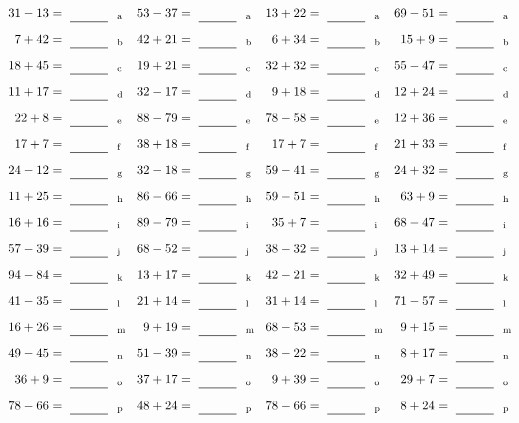 \documentclass
[
  draft    = true,
  fontsize = 11pt,
  parskip  = half-
]
{scrartcl}
\begin{document}
\clearpage
\begin{align*}
    \pline{31-13}&=\rline{a}
  & \pline{53-37}&=\rline{a}
  & \pline{13+22}&=\rline{a}
  & \pline{69-51}&=\rline{a} \\[1ex]
    \pline{7+42}&=\rline{b}
  & \pline{42+21}&=\rline{b}
  & \pline{6+34}&=\rline{b}
  & \pline{15+9}&=\rline{b} \\[1ex]
    \pline{18+45}&=\rline{c}
  & \pline{19+21}&=\rline{c}
  & \pline{32+32}&=\rline{c}
  & \pline{55-47}&=\rline{c} \\[1ex]
    \pline{11+17}&=\rline{d}
  & \pline{32-17}&=\rline{d}
  & \pline{9+18}&=\rline{d}
  & \pline{12+24}&=\rline{d} \\[1ex]
    \pline{22+8}&=\rline{e}
  & \pline{88-79}&=\rline{e}
  & \pline{78-58}&=\rline{e}
  & \pline{12+36}&=\rline{e} \\[1ex]
    \pline{17+7}&=\rline{f}
  & \pline{38+18}&=\rline{f}
  & \pline{17+7}&=\rline{f}
  & \pline{21+33}&=\rline{f} \\[1ex]
    \pline{24-12}&=\rline{g}
  & \pline{32-18}&=\rline{g}
  & \pline{59-41}&=\rline{g}
  & \pline{24+32}&=\rline{g} \\[1ex]
    \pline{11+25}&=\rline{h}
  & \pline{86-66}&=\rline{h}
  & \pline{59-51}&=\rline{h}
  & \pline{63+9}&=\rline{h} \\[1ex]
    \pline{16+16}&=\rline{i}
  & \pline{89-79}&=\rline{i}
  & \pline{35+7}&=\rline{i}
  & \pline{68-47}&=\rline{i} \\[1ex]
    \pline{57-39}&=\rline{j}
  & \pline{68-52}&=\rline{j}
  & \pline{38-32}&=\rline{j}
  & \pline{13+14}&=\rline{j} \\[1ex]
    \pline{94-84}&=\rline{k}
  & \pline{13+17}&=\rline{k}
  & \pline{42-21}&=\rline{k}
  & \pline{32+49}&=\rline{k} \\[1ex]
    \pline{41-35}&=\rline{l}
  & \pline{21+14}&=\rline{l}
  & \pline{31+14}&=\rline{l}
  & \pline{71-57}&=\rline{l} \\[1ex]
    \pline{16+26}&=\rline{m}
  & \pline{9+19}&=\rline{m}
  & \pline{68-53}&=\rline{m}
  & \pline{9+15}&=\rline{m} \\[1ex]
    \pline{49-45}&=\rline{n}
  & \pline{51-39}&=\rline{n}
  & \pline{38-22}&=\rline{n}
  & \pline{8+17}&=\rline{n} \\[1ex]
    \pline{36+9}&=\rline{o}
  & \pline{37+17}&=\rline{o}
  & \pline{9+39}&=\rline{o}
  & \pline{29+7}&=\rline{o} \\[1ex]
    \pline{78-66}&=\rline{p}
  & \pline{48+24}&=\rline{p}
  & \pline{78-66}&=\rline{p}
  & \pline{8+24}&=\rline{p}
\end{align*}
\end{document}
